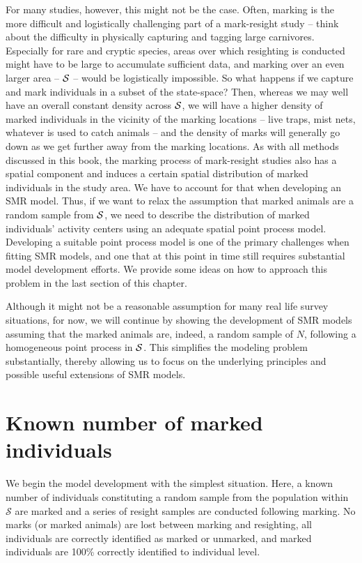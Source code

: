 For many studies, however, this might not be the
case. Often, marking is the more difficult and logistically
challenging part of a mark-resight study -- think about the difficulty in
physically capturing and tagging
large carnivores. Especially for rare and cryptic species, areas over
which resighting is conducted might have to be large to accumulate
sufficient data, and marking over an even larger area -- ${\cal S}$ --
would be logistically impossible.
So what happens if we capture and mark individuals in a subset of the
state-space? Then, whereas we may well have an overall constant density
across ${\cal S}$, we will have a higher density of marked individuals in the vicinity of the marking locations -- live
traps, mist nets, whatever is used to catch animals -- and the density of marks will generally go down as we get further away from the marking
locations. As with all methods discussed in this book, the marking process of mark-resight studies also has a spatial component and induces a certain spatial distribution of marked individuals in the study area. We have to account for that when developing an SMR model.
Thus, if we want to relax the assumption that marked animals are a random sample from ${\cal S}$, we need to describe the distribution of marked individuals' activity centers using an adequate spatial
point process model. Developing a suitable point process model is one of the primary
challenges when fitting SMR models, and one that at this point in time
still requires substantial model development efforts.
 We provide some ideas on how to approach this problem in the last section of
this chapter.

Although it might not be a reasonable assumption for many real life
survey situations, for now, we will continue by showing the development of
SMR models
assuming that the marked animals are, indeed, a random sample of $N$,
following a homogeneous point process in ${\cal S}$. This simplifies
the modeling problem substantially, thereby allowing us to focus on
the underlying principles and possible useful extensions of SMR
models.



\section{Known number of marked individuals}

We begin the model development with the simplest situation. Here, a
known number of individuals constituting a random
sample from the population within $\mathcal{S}$ are marked and a
series of resight samples are conducted following marking. No marks
(or marked animals) are lost between marking and resighting, all
individuals are correctly identified as marked or unmarked, and marked
individuals are 100\% correctly identified to individual level.

